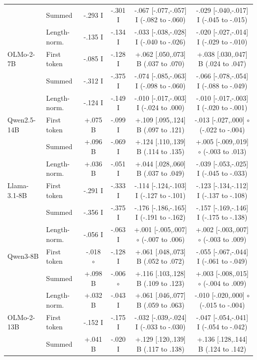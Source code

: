 \begin{table}[t]
\begin{tabular}{@{}llcccc@{}}
 & Summed & -.293 I & -.301 I & -.067 [-.077,-.057] I (-.082 to -.060) & -.029 [-.040,-.017] I (-.045 to -.015) \\
 & Length-norm. & -.135 I & -.134 I & -.033 [-.038,-.028] I (-.040 to -.026) & -.020 [-.027,-.014] I (-.029 to -.010) \\
\addlinespace[1pt]
OLMo-2-7B & First token & -.085 I & -.128 I & +.062 [.050,.073] B (.037 to .070) & +.038 [.030,.047] B (.024 to .047) \\
 & Summed & -.312 I & -.375 I & -.074 [-.085,-.063] I (-.098 to -.060) & -.066 [-.078,-.054] I (-.088 to -.049) \\
 & Length-norm. & -.124 I & -.149 I & -.010 [-.017,-.003] I (-.024 to .000) & -.010 [-.017,-.003] I (-.020 to -.001) \\
\addlinespace[1pt]
Qwen2.5-14B & First token & +.075 B & -.099 I & +.109 [.095,.124] B (.097 to .121) & -.013 [-.027,.000] $\circ$ (-.022 to -.004) \\
 & Summed & +.096 B & -.069 I & +.124 [.110,.139] B (.114 to .135) & +.005 [-.009,.019] $\circ$ (-.003 to .013) \\
 & Length-norm. & +.036 B & -.051 I & +.044 [.028,.060] B (.037 to .049) & -.039 [-.053,-.025] I (-.045 to -.033) \\
\addlinespace[1pt]
Llama-3.1-8B & First token & -.291 I & -.333 I & -.114 [-.124,-.103] I (-.127 to -.101) & -.123 [-.134,-.112] I (-.137 to -.108) \\
 & Summed & -.356 I & -.375 I & -.176 [-.186,-.165] I (-.191 to -.162) & -.157 [-.169,-.146] I (-.175 to -.138) \\
 & Length-norm. & -.056 I & -.063 I & +.001 [-.005,.007] $\circ$ (-.007 to .006) & +.002 [-.003,.007] $\circ$ (-.003 to .009) \\
\addlinespace[1pt]
Qwen3-8B & First token & -.018 $\circ$ & -.128 I & +.061 [.048,.073] B (.052 to .072) & -.055 [-.067,-.044] I (-.061 to -.049) \\
 & Summed & +.098 B & -.006 $\circ$ & +.116 [.103,.128] B (.109 to .123) & +.003 [-.008,.015] $\circ$ (-.004 to .009) \\
 & Length-norm. & +.032 B & -.043 I & +.061 [.046,.077] B (.059 to .063) & -.010 [-.020,.000] $\circ$ (-.015 to -.004) \\
\addlinespace[1pt]
OLMo-2-13B & First token & -.152 I & -.175 I & -.032 [-.039,-.024] I (-.033 to -.030) & -.047 [-.054,-.041] I (-.054 to -.042) \\
 & Summed & +.041 B & -.020 I & +.129 [.120,.139] B (.117 to .138) & +.136 [.128,.144] B (.124 to .142) \\

\end{tabular}
\end{table}
